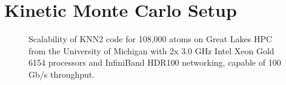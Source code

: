 \section{Kinetic Monte Carlo Setup}
\label{Chap:Al/Vac:section:KMC}

\newpage
\begingroup
\begin{figure}[!ht]
  \centering
\caption[Scalability of KNN2 code on Great Lakes HPC.]{Scalability of KNN2 code for 108,000 atoms on Great Lakes HPC from the University of Michigan with 2x 3.0 GHz Intel Xeon Gold 6154 processors and InfiniBand HDR100 networking, capable of 100 Gb/s throughput.}
\label{Chap:Al/Vac:fig:scale}
\end{figure}
\endgroup
